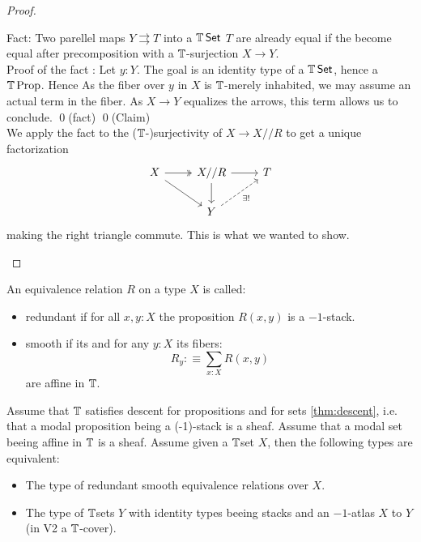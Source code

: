 \begin{proof}
\begin{itemize}
		Fact: Two parellel maps $Y \rightrightarrows T$ into a $\mathbb{T} \operatorname{\mathsf {Set}}$ $T$ are already equal if the become equal after precomposition with a $\mathbb{T}$-surjection $X \to Y$.  \\
		Proof of the fact : Let $y : Y$. The goal is an identity type of a $\mathbb{T} \operatorname{\mathsf {Set}}$, hence a $\mathbb{T} \operatorname{Prop}$. Hence As the fiber over $y$ in $X$ is $\mathbb{T}$-merely inhabited, we may assume an actual term in the fiber. 	As $X \to Y$ equalizes the arrows, this term allows us to conclude. \qed (fact)	\qed(Claim) \\
		We apply the fact to the ($\mathbb{T}$-)surjectivity of $X \to X // R $ to get a unique factorization 
		\[\begin{tikzcd}
			X & {X // R} & T \\
			& Y
			\arrow[two heads, from=1-1, to=1-2]
			\arrow[from=1-1, to=2-2]
			\arrow[from=1-2, to=1-3]
			\arrow[from=1-2, to=2-2]
			\arrow["{\exists!}"', dashed, from=2-2, to=1-3]
		\end{tikzcd}\]
		making the right triangle commute. This is what we wanted to show.
	\end{itemize}
\end{proof}

\begin{definition}
	An equivalence relation $R$ on a type $X$ is called:
	\begin{itemize}
		\item redundant if for all $x,y:X$ the proposition $R(x,y)$ is a  $-1$-stack.
		\item smooth if its  and for any $y:X$ its fibers:
		\[R_y :\equiv \sum_{x:X} R(x,y)\]
		are affine in $\mathbb{T}$.
	\end{itemize}
\end{definition}

\begin{lemma}\label{fundamental-propriety-algebraic-spaces}
	Assume that $\mathbb{T}$ satisfies descent for propositions and for sets \ref{thm:descent}, i.e. that a modal proposition being a  (-1)-stack is a sheaf. Assume that a modal set beeing affine in $\mathbb{T}$ is a sheaf.
	Assume given a $\mathbb{T}$set $X$, then the following types are equivalent:
	\begin{itemize}
		\item The type of redundant smooth equivalence relations over $X$.
		\item The type of $\mathbb{T}$sets $Y$ with identity types beeing  stacks and an $-1$-atlas $X$ to $Y$ (in V2 a $\mathbb{T}$-cover).
	\end{itemize}
\end{lemma}

